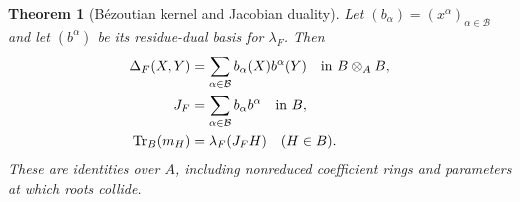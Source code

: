 \documentclass[11pt,letterpaper,oneside]{article}
\numberwithin{equation}{section}
\newtheorem{theorem}{Theorem}[section]
\theoremstyle{definition}
\theoremstyle{remark}\newtheorem{remark}[theorem]{Remark}
\begin{document}
\begin{theorem}[B\'ezoutian kernel and Jacobian duality]\label{thm:jacobian}
Let $(b_\alpha)=(x^\alpha)_{\alpha\in\mathcal B}$ and let
$(b^\alpha)$ be its residue-dual basis for $\lambda_F$. Then
\begin{align}
 \Delta_F(X,Y)&=\sum_{\alpha\in\mathcal B}
 b_\alpha(X)b^\alpha(Y)\quad\text{in }B\otimes_A B,
 \label{eq:casimir}\\
 J_F&=\sum_{\alpha\in\mathcal B}b_\alpha b^\alpha
 \quad\text{in }B,\label{eq:jacobianeuler}\\
 \operatorname{Tr}_B(m_H)&=\lambda_F(J_FH)\quad(H\in B).
 \label{eq:jacobiantrace}
\end{align}
These are identities over $A$, including nonreduced coefficient rings
and parameters at which roots collide.
\end{theorem}
\end{document}
